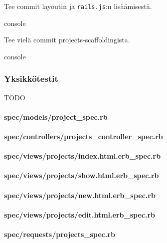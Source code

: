 \documentclass{article}
\begin{document}
\begin{samepage}
Tee commit layoutin ja \texttt{rails.js}:n lisäämisestä.

\begin{pygmented}{console}
\end{pygmented}
\end{samepage}

\begin{samepage}
Tee vielä commit projects-scaffoldingista.

\begin{pygmented}{console}
\end{pygmented}
\end{samepage}

\subsubsection{Yksikkötestit}

TODO

\paragraph{spec/models/project\_spec.rb}
\paragraph{spec/controllers/projects\_controller\_spec.rb}
\paragraph{spec/views/projects/index.html.erb\_spec.rb}
\paragraph{spec/views/projects/show.html.erb\_spec.rb}
\paragraph{spec/views/projects/new.html.erb\_spec.rb}
\paragraph{spec/views/projects/edit.html.erb\_spec.rb}
\paragraph{spec/requests/projects\_spec.rb}
\end{document}
